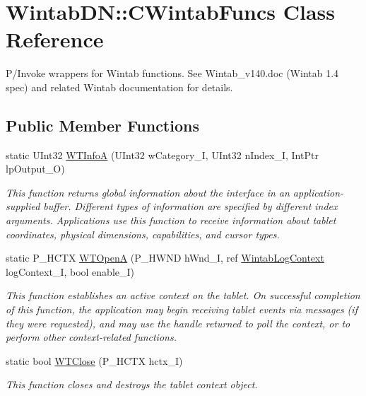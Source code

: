 \hypertarget{class_wintab_d_n_1_1_c_wintab_funcs}{
\section{WintabDN::CWintabFuncs Class Reference}
\label{class_wintab_d_n_1_1_c_wintab_funcs}
}


P/Invoke wrappers for Wintab functions. See Wintab\_\-v140.doc (Wintab 1.4 spec) and related Wintab documentation for details.  


\subsection*{Public Member Functions}
\begin{DoxyCompactItemize}
\item 
static UInt32 \hyperlink{class_wintab_d_n_1_1_c_wintab_funcs_a2ec8c8377a44ea036a5c7fe7c365cf95}{WTInfoA} (UInt32 wCategory\_\-I, UInt32 nIndex\_\-I, IntPtr lpOutput\_\-O)
\begin{DoxyCompactList}\small\item\em This function returns global information about the interface in an application-\/supplied buffer. Different types of information are specified by different index arguments. Applications use this function to receive information about tablet coordinates, physical dimensions, capabilities, and cursor types. \item\end{DoxyCompactList}\item 
static P\_\-HCTX \hyperlink{class_wintab_d_n_1_1_c_wintab_funcs_a81266ff31a9a8f8091c3b84a10fec0ca}{WTOpenA} (P\_\-HWND hWnd\_\-I, ref \hyperlink{struct_wintab_d_n_1_1_wintab_log_context}{WintabLogContext} logContext\_\-I, bool enable\_\-I)
\begin{DoxyCompactList}\small\item\em This function establishes an active context on the tablet. On successful completion of this function, the application may begin receiving tablet events via messages (if they were requested), and may use the handle returned to poll the context, or to perform other context-\/related functions. \item\end{DoxyCompactList}\item 
static bool \hyperlink{class_wintab_d_n_1_1_c_wintab_funcs_af86aa97fc2ba0deb549d069bba7a29c7}{WTClose} (P\_\-HCTX hctx\_\-I)
\begin{DoxyCompactList}\small\item\em This function closes and destroys the tablet context object. \item\end{DoxyCompactList}\item 

\end{DoxyCompactItemize}
